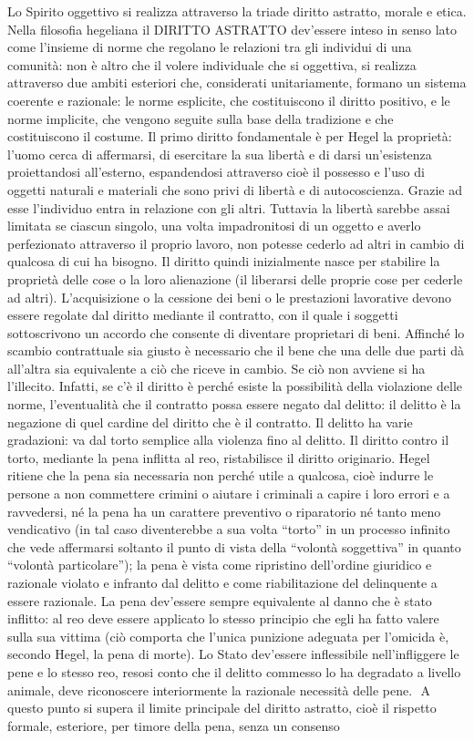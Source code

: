 \documentclass[a4paper,12pt,oneside,openany]{book}%
\begin{document}
Lo Spirito oggettivo si realizza attraverso la triade diritto astratto, morale e etica. Nella filosofia hegeliana il DIRITTO ASTRATTO dev’essere inteso in senso lato come l’insieme di norme che regolano le relazioni tra gli individui di una comunità: non è altro che il volere individuale che si oggettiva, si realizza attraverso due ambiti esteriori che, considerati unitariamente, formano un sistema coerente e razionale: le norme esplicite, che costituiscono il diritto positivo, e le norme implicite, che vengono seguite sulla base della tradizione e che costituiscono il costume. Il primo diritto fondamentale è per Hegel la proprietà: l’uomo cerca di affermarsi, di esercitare la sua libertà e di darsi un’esistenza proiettandosi all’esterno, espandendosi attraverso cioè il possesso e l’uso di oggetti naturali e materiali che sono privi di libertà e di autocoscienza. Grazie ad esse l’individuo entra in relazione con gli altri. Tuttavia la libertà sarebbe assai limitata se ciascun singolo, una volta impadronitosi di un oggetto e averlo perfezionato attraverso il proprio lavoro, non potesse cederlo ad altri in cambio di qualcosa di cui ha bisogno. Il diritto quindi inizialmente nasce per stabilire la proprietà delle cose o la loro alienazione (il liberarsi delle proprie cose per cederle ad altri). L’acquisizione o la cessione dei beni o le prestazioni lavorative devono essere regolate dal diritto mediante il contratto, con il quale i soggetti sottoscrivono un accordo che consente di diventare proprietari di beni. Affinché lo scambio contrattuale sia giusto è necessario che il bene che una delle due parti dà all’altra sia equivalente a ciò che riceve in cambio. Se ciò non avviene si ha l’illecito. Infatti, se c’è il diritto è perché esiste la possibilità della violazione delle norme, l’eventualità che il contratto possa essere negato dal delitto: il delitto è la negazione di quel cardine del diritto che è il contratto. Il delitto ha varie gradazioni: va dal torto semplice alla violenza fino al delitto. Il diritto contro il torto, mediante la pena inflitta al reo, ristabilisce il diritto originario. Hegel ritiene che la pena sia necessaria non perché utile a qualcosa, cioè indurre le persone a non commettere crimini o aiutare i criminali a capire i loro errori e a ravvedersi, né la pena ha un carattere preventivo o riparatorio né tanto meno vendicativo (in tal caso diventerebbe a sua volta “torto” in un processo infinito che vede affermarsi soltanto il punto di vista della “volontà soggettiva” in quanto “volontà particolare”); la pena è vista come ripristino dell’ordine giuridico e razionale violato e infranto dal delitto e come riabilitazione del delinquente a essere razionale. La pena dev’essere sempre equivalente al danno che è stato inflitto: al reo deve essere applicato lo stesso principio che egli ha fatto valere sulla sua vittima (ciò comporta che l’unica punizione adeguata per l’omicida è, secondo Hegel, la pena di morte). Lo Stato dev’essere inflessibile nell’infliggere le pene e lo stesso reo, resosi conto che il delitto commesso lo ha degradato a livello animale, deve riconoscere interiormente la razionale necessità delle pene.  A questo punto si supera il limite principale del diritto astratto, cioè il rispetto formale, esteriore, per timore della pena, senza un consenso 
\end{document}
